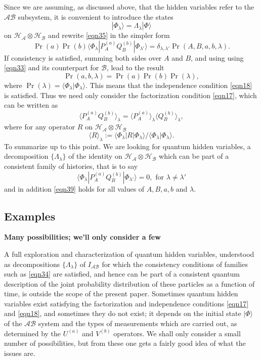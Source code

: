 \documentclass[12pt]{article} %
\def\outl#1{\par{\medskip\noindent\hspace*{.5cm}\bf
      \mathversion{bold}#1\mathversion{normal}\smallskip} }
\def\np{} \def\xa{} \def\xb{} \def\xn{} \def\xp{}
\def\outl#1{} \def\np{} \def\xa{} \def\xb{} \def\xn{} \def\xp{}
\def\outl#1{\par{\medskip\noindent\hspace*{.5cm}\bf
      \mathversion{bold}#1\mathversion{normal}\smallskip} }
\def\np{\newpage }\def\xn{\nopagebreak }\def\xp{\pagebreak }
\newcommand{\avg}[1]{\langle #1\rangle }
\newcommand{\inp}[1]{\lgl#1|#1\rgl }
\newcommand{\ket}[1]{|#1\rgl }
\newcommand{\lgl}{\langle }
\newcommand{\mte}[2]{\lgl#1|#2|#1\rgl }
\newcommand{\mted}[3]{\lgl#1|#2|#3\rgl }
\newcommand{\ot}{\otimes }
\newcommand{\rgl}{\rangle }
\newcommand{\AM}{{\mathcal A}}
\newcommand{\BM}{{\mathcal B}}
\newcommand{\HM}{{\mathcal H}}
\newcommand{\dl}{\delta }
\newcommand{\lm}{\lambda }
\newcommand{\Lm}{\Lambda }
\begin{document}
Since we are assuming, as discussed above, that the hidden variables refer to
the $\AM\BM$ subsystem, it is convenient to introduce the states
\begin{equation}
  \ket{\Phi_\lm} = \Lm_\lm\ket{\Phi}
\label{eqn36}
\end{equation}
on $\HM_\AM\ot\HM_\BM$ and rewrite \eqref{eqn35}
in the simpler form
\begin{equation}
  \Pr(a)\Pr(b)\mted{\Phi_\lm}{P^{(a)}_AQ^{(b)}_B}{\Phi_{\lm'}} =
 \dl_{\lm,\lm'} \Pr(A,B,a,b,\lm).
\label{eqn37}
\end{equation}
If consistency is satisfied, summing both sides over $A$ and $B$, and using
using \eqref{eqn33} and its counterpart for $\BM$, lead to the result
\begin{equation}
  \Pr(a,b,\lm) = \Pr(a)\Pr(b)\Pr(\lm),
\label{eqn38}
\end{equation}
where $\Pr(\lm)=\inp{\Phi_\lm}$.  This means that the independence condition
\eqref{eqn18} is satisfied.  Thus we need only consider 
the factorization condition \eqref{eqn17}, which can be written as
\begin{equation}
  \avg{P^{(a)}_AQ^{(b)}_B}_\lm =\avg{P^{(a)}_A}_\lm \avg{Q^{(b)}_B}_\lm,
\label{eqn39}
\end{equation}
where for any operator $R$ on $\HM_\AM\ot \HM_\BM$
\begin{equation}
  \avg{R}_\lm := \mte{\Phi_\lm}{R}/\inp{\Phi_\lm}.
\label{eqn40}
\end{equation}
To summarize up to this point.  We are looking for quantum hidden variables, a
decomposition $\{\Lm_\lm\}$ of the identity on $\HM_\AM\ot \HM_\BM$ which can be
part of a consistent family of histories, that is to say
\begin{equation}
  \mted{\Phi_\lm}{P^{(a)}_AQ^{(b)}_B}{\Phi_{\lm'}} = 0,
   \text{ for } \lm\neq\lm'
\label{eqn41}
\end{equation}
and in addition \eqref{eqn39} holds for all values of $A,B,a,b$ and $\lm$.

\xb
\subsection{Examples}
\label{sct5d}
\xa

\xb
\outl{Many possibilities; we'll only consider a few}
\xa




A full exploration and characterization of quantum hidden variables,
understood as decompositions $\{\Lm_\lm\}$ of $I_{\AM\BM}$ for which the
consistency conditions of families such as \eqref{eqn34} are satisfied, and
hence can be part of a consistent quantum description of the joint probability
distribution of these particles as a function of time, is outside the scope of
the present paper.  Sometimes quantum hidden variables exist satisfying the
factorization and independence conditions \eqref{eqn17} and \eqref{eqn18}, and
sometimes they do not exist; it depends on the initial state $\ket{\Phi}$ of
the $\AM\BM$ system and the types of measurements which are carried out, as
determined by the $U^{(a)}$ and $V^{(b)}$ operators.  We shall only consider a
small number of possibilities, but from these one gets a fairly good idea
of what the issues are.
\end{document}
